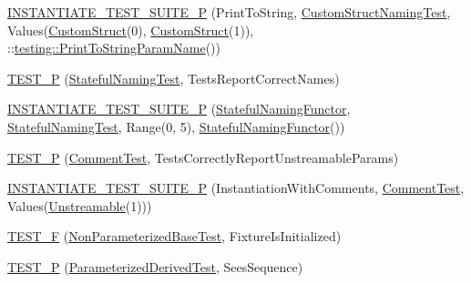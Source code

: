 \begin{DoxyCompactItemize}
\item 
\mbox{\hyperlink{_obj__test_2lib_2googletest-master_2googletest_2test_2googletest-param-test-test_8cc_a387c3e2c74686ab03b23325a384730b6}{I\+N\+S\+T\+A\+N\+T\+I\+A\+T\+E\+\_\+\+T\+E\+S\+T\+\_\+\+S\+U\+I\+T\+E\+\_\+P}} (Print\+To\+String, \mbox{\hyperlink{class_custom_struct_naming_test}{Custom\+Struct\+Naming\+Test}}, Values(\mbox{\hyperlink{struct_custom_struct}{Custom\+Struct}}(0), \mbox{\hyperlink{struct_custom_struct}{Custom\+Struct}}(1)), \+::\mbox{\hyperlink{structtesting_1_1_print_to_string_param_name}{testing\+::\+Print\+To\+String\+Param\+Name}}())
\item 
\mbox{\hyperlink{_obj__test_2lib_2googletest-master_2googletest_2test_2googletest-param-test-test_8cc_a567e8106d701ab56bdc7e610ef119450}{T\+E\+S\+T\+\_\+P}} (\mbox{\hyperlink{class_stateful_naming_test}{Stateful\+Naming\+Test}}, Tests\+Report\+Correct\+Names)
\item 
\mbox{\hyperlink{_obj__test_2lib_2googletest-master_2googletest_2test_2googletest-param-test-test_8cc_a260030f4afd03030d56cbddcc921bca0}{I\+N\+S\+T\+A\+N\+T\+I\+A\+T\+E\+\_\+\+T\+E\+S\+T\+\_\+\+S\+U\+I\+T\+E\+\_\+P}} (\mbox{\hyperlink{struct_stateful_naming_functor}{Stateful\+Naming\+Functor}}, \mbox{\hyperlink{class_stateful_naming_test}{Stateful\+Naming\+Test}}, Range(0, 5), \mbox{\hyperlink{struct_stateful_naming_functor}{Stateful\+Naming\+Functor}}())
\item 
\mbox{\hyperlink{_obj__test_2lib_2googletest-master_2googletest_2test_2googletest-param-test-test_8cc_a5c5935ee04b0f74f29114ed7e1fa2315}{T\+E\+S\+T\+\_\+P}} (\mbox{\hyperlink{class_comment_test}{Comment\+Test}}, Tests\+Correctly\+Report\+Unstreamable\+Params)
\item 
\mbox{\hyperlink{_obj__test_2lib_2googletest-master_2googletest_2test_2googletest-param-test-test_8cc_ab4ce7793d1d1d75035b8af30c3548a42}{I\+N\+S\+T\+A\+N\+T\+I\+A\+T\+E\+\_\+\+T\+E\+S\+T\+\_\+\+S\+U\+I\+T\+E\+\_\+P}} (Instantiation\+With\+Comments, \mbox{\hyperlink{class_comment_test}{Comment\+Test}}, Values(\mbox{\hyperlink{class_unstreamable}{Unstreamable}}(1)))
\item 
\mbox{\hyperlink{_obj__test_2lib_2googletest-master_2googletest_2test_2googletest-param-test-test_8cc_af8865fa8411285bd2492b5105f35a7de}{T\+E\+S\+T\+\_\+F}} (\mbox{\hyperlink{class_non_parameterized_base_test}{Non\+Parameterized\+Base\+Test}}, Fixture\+Is\+Initialized)
\item 
\mbox{\hyperlink{_obj__test_2lib_2googletest-master_2googletest_2test_2googletest-param-test-test_8cc_a92492aa8cc7fda6eb6438c6f7c74e478}{T\+E\+S\+T\+\_\+P}} (\mbox{\hyperlink{class_parameterized_derived_test}{Parameterized\+Derived\+Test}}, Sees\+Sequence)

\end{DoxyCompactItemize}
